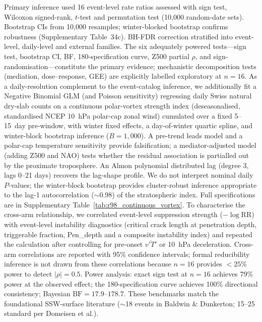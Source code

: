 \documentclass[11pt,letterpaper]{article}
\begin{document}
Primary inference used 16 event-level rate ratios assessed with sign test, Wilcoxon signed-rank, $t$-test and permutation test (10,000 random-date sets). Bootstrap CIs from 10,000 resamples; winter-blocked bootstrap confirms robustness (Supplementary Table~34c). BH-FDR correction stratified into event-level, daily-level and external families. The six adequately powered tests---sign test, bootstrap CI, BF, 180-specification curve, Z500 partial $\rho$, and sign-randomisation---constitute the primary evidence; mechanistic decomposition tests (mediation, dose--response, GEE) are explicitly labelled exploratory at $n = 16$. As a daily-resolution complement to the event-catalog inference, we additionally fit a Negative Binomial GLM (and Poisson sensitivity) regressing daily Swiss natural dry-slab counts on a continuous polar-vortex strength index (deseasonalised, standardised NCEP 10~hPa polar-cap zonal wind) cumulated over a fixed 5--15~day pre-window, with winter fixed effects, a day-of-winter quartic spline, and winter-block bootstrap inference ($B = 1{,}000$). A pre-trend leads model and a polar-cap temperature sensitivity provide falsification; a mediator-adjusted model (adding Z500 and NAO) tests whether the residual association is partialled out by the proximate troposphere. An Almon polynomial distributed lag (degree 3, lags 0--21 days) recovers the lag-shape profile. We do not interpret nominal daily $P$-values; the winter-block bootstrap provides cluster-robust inference appropriate to the lag-1 autocorrelation ($\sim$0.98) of the stratospheric index. Full specifications are in Supplementary Table~\ref{tab:r98_continuous_vortex}. To characterise the cross-arm relationship, we correlated event-level suppression strength ($-\log \mathrm{RR}$) with event-level instability diagnostics (critical crack length at penetration depth, triggerable fraction, Pen\_depth and a composite instability index) and repeated the calculation after controlling for pre-onset $\overline{v'T'}$ or 10~hPa deceleration. Cross-arm correlations are reported with 95\% confidence intervals; formal reducibility inference is not drawn from these correlations because $n = 16$ provides $< 25\%$ power to detect $|\rho| = 0.5$. Power analysis: exact sign test at $n = 16$ achieves 79\% power at the observed effect; the 180-specification curve achieves 100\% directional consistency; Bayesian $\mathrm{BF} = 17.9$--$178.7$. These benchmarks match the foundational SSW-surface literature ($\sim$18 events in Baldwin \& Dunkerton\cite{Baldwin2001}; 15--25 standard per Domeisen et al.\cite{Domeisen2020}).
\end{document}

